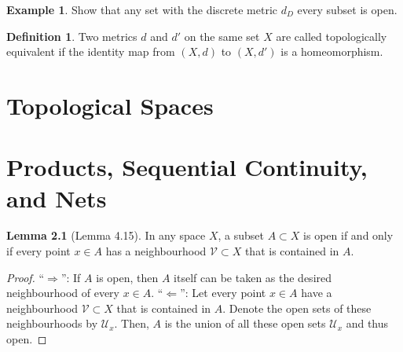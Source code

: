 \documentclass[a4paper]{book}
\theoremstyle{definition}
\newtheorem{definition}{Definition}[]
\newtheorem{example}{Example}[definition]
\newtheorem{lemma}[definition]{Lemma}
\begin{document}
\begin{example}
    Show that any set with the discrete metric \(d_D\) every subset is open.
\end{example}

\begin{defbox}
    \begin{definition}
        Two metrics \(d\) and \(d'\) on the same set \(X\) are called topologically equivalent if the identity map from \((X, d)\) to \((X, d')\) is a homeomorphism.
    \end{definition}
\end{defbox}


\chapter{Topological Spaces}
\chapter{Products, Sequential Continuity, and Nets}

\begin{thmbox}
    \begin{lemma}[Lemma 4.15]
        In any space \(X\), a subset \(A \subset X\) is open if and only if every point \(x \in A\) has a neighbourhood \(\mathcal{V} \subset X\) that is contained in \(A\).
    \end{lemma}
\end{thmbox}
\begin{proof}
    ``\(\Rightarrow\)'': If \(A\) is open, then \(A\) itself can be taken as the desired neighbourhood of every \(x \in A\).
    ``\(\Leftarrow\)'': Let every point \(x \in A\) have a neighbourhood \(\mathcal{V} \subset X\) that is contained in \(A\). Denote the open sets of these neighbourhoods by \(\mathcal{U}_x\). Then, \(A\) is the union of all these open sets \(\mathcal{U}_x\) and thus open.
\end{proof}
\end{document}
